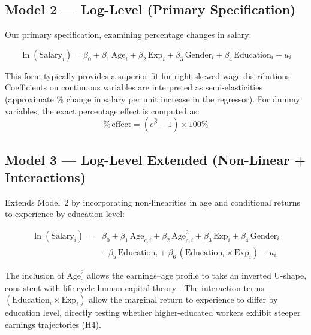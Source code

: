 \documentclass[12pt, a4paper]{article}
\begin{document}
\subsection{Model 2 — Log-Level (Primary Specification)}

Our primary specification, examining percentage changes in salary:

\begin{equation}
  \ln(\text{Salary}_i) = \beta_0 + \beta_1\,\text{Age}_i + \beta_2\,\text{Exp}_i + \beta_3\,\text{Gender}_i + \beta_4\,\text{Education}_i + u_i
  \label{eq:m2}
\end{equation}

This form typically provides a superior fit for right-skewed wage distributions.
Coefficients on continuous variables are interpreted as semi-elasticities (approximate
\% change in salary per unit increase in the regressor). For dummy variables, the exact
percentage effect is computed as:
\[
  \%\,\text{effect} = \left(e^{\hat{\beta}} - 1\right) \times 100\%
\]

\subsection{Model 3 — Log-Level Extended (Non-Linear + Interactions)}

Extends Model~2 by incorporating non-linearities in age and conditional returns to
experience by education level:

\begin{equation}
\begin{aligned}
  \ln(\text{Salary}_i) ={}& \beta_0 + \beta_1\,\text{Age}_{c,i} + \beta_2\,\text{Age}_{c,i}^2 + \beta_3\,\text{Exp}_i + \beta_4\,\text{Gender}_i \\
    &+ \beta_5\,\text{Education}_i + \beta_6\,(\text{Education}_i \times \text{Exp}_i) + u_i
\end{aligned}
  \label{eq:m3}
\end{equation}

The inclusion of $\text{Age}_c^2$ allows the earnings--age profile to take an inverted
U-shape, consistent with life-cycle human capital theory \citep{benporath1967}. The
interaction terms $(\text{Education}_i \times \text{Exp}_i)$ allow the marginal return to
experience to differ by education level, directly testing whether higher-educated workers
exhibit steeper earnings trajectories (H4).
\end{document}
